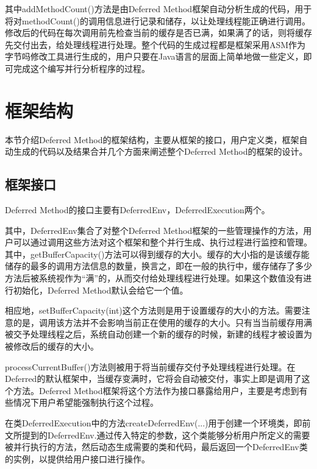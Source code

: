 其中addMethodCount()方法是由Deferred Method框架自动分析生成的代码，用于将对methodCount()的调用信息进行记录和储存，以让处理线程能正确进行调用。修改后的代码在每次调用前先检查当前的缓存是否已满，如果满了的话，则将缓存先交付出去，给处理线程进行处理。整个代码的生成过程都是框架采用ASM作为字节吗修改工具进行生成的，用户只要在Java语言的层面上简单地做一些定义，即可完成这个编写并行分析程序的过程。

\section{框架结构}

本节介绍Deferred Method的框架结构，主要从框架的接口，用户定义类，框架自动生成的代码以及结果合并几个方面来阐述整个Deferred Method的框架的设计。

\subsection{框架接口}

Deferred Method的接口主要有DeferredEnv，DeferredExecution两个。


其中，DeferredEnv集合了对整个Deferred Method框架的一些管理操作的方法，用户可以通过调用这些方法对这个框架和整个并行生成、执行过程进行监控和管理。其中，getBufferCapacity()方法可以得到缓存的大小。缓存的大小指的是该缓存能储存的最多的调用方法信息的数量，换言之，即在一般的执行中，缓存储存了多少方法后被系统视作为“满”的，从而交付给处理线程进行处理。如果这个数值没有进行初始化，Deferred Method默认会给它一个值。

相应地，setBufferCapacity(int)这个方法则是用于设置缓存的大小的方法。需要注意的是，调用该方法并不会影响当前正在使用的缓存的大小。只有当当前缓存用满被交予处理线程之后，系统自动创建一个新的缓存的时候，新建的线程才被设置为被修改后的缓存的大小。

processCurrentBuffer()方法则被用于将当前缓存交付予处理线程进行处理。在Deferred的默认框架中，当缓存变满时，它将会自动被交付，事实上即是调用了这个方法。Deferred Method框架将这个方法作为接口暴露给用户，主要是考虑到有些情况下用户希望能强制执行这个过程。

在类DeferredExecution中的方法createDeferredEnv(...)用于创建一个环境类，即前文所提到的DeferredEnv.通过传入特定的参数，这个类能够分析用户所定义的需要被并行执行的方法，然后动态生成需要的类和代码，最后返回一个DeferredEnv类的实例，以提供给用户接口进行操作。

